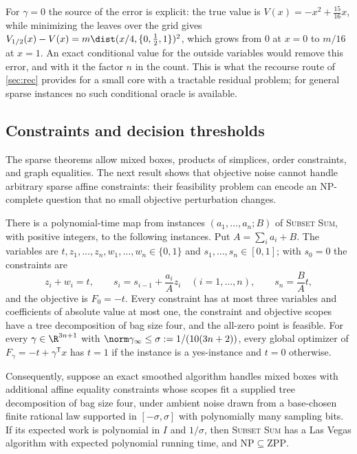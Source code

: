 For $\gamma=0$ the source of the error is explicit: the true value is
$V(x)=-x^2+\frac{15}{16}x$, while minimizing the leaves over the grid gives
$V_{1/2}(x)-V(x)=m\dist(x/4,\{0,\frac12,1\})^2$, which grows from $0$ at
$x=0$ to $m/16$ at $x=1$. An exact conditional value for the outside
variables would remove this error, and with it the factor $n$ in the count.
This is what the recourse route of \cref{sec:rec} provides for a small core
with a tractable residual problem; for general sparse instances no such
conditional oracle is available.

\subsection{Constraints and decision thresholds}\label{sec:lim:constraints}

The sparse theorems allow mixed boxes, products of simplices, order
constraints, and graph equalities. The next result shows that objective
noise cannot handle arbitrary sparse affine constraints: their feasibility
problem can encode an NP-complete question that no small objective
perturbation changes.

\begin{theorem}\label{thm:lim:constraints}
There is a polynomial-time map from instances $(a_1,\ldots,a_n;B)$ of
\textsc{Subset Sum}, with positive integers, to the following instances.
Put $A=\sum_ia_i+B$. The variables are $t,z_1,\ldots,z_n,w_1,\ldots,w_n\in
\{0,1\}$ and $s_1,\ldots,s_n\in[0,1]$; with $s_0=0$ the constraints are
\[
 z_i+w_i=t,\qquad s_i=s_{i-1}+\frac{a_i}Az_i\quad(i=1,\ldots,n),\qquad
 s_n=\frac BAt,
\]
and the objective is $F_0=-t$. Every constraint has at most three variables
and coefficients of absolute value at most one, the constraint and objective
scopes have a tree decomposition of bag size four, and the all-zero point is
feasible. For every $\gamma\in\R^{3n+1}$ with
$\norm\gamma_\infty\le\sigma:=1/(10(3n+2))$, every global optimizer of
$F_\gamma=-t+\gamma^{\mathsf T}x$ has $t=1$ if the instance is a
yes-instance and $t=0$ otherwise.

Consequently, suppose an exact smoothed algorithm handles mixed boxes with
additional affine equality constraints whose scopes fit a supplied tree
decomposition of bag size four, under ambient noise drawn from a
base-chosen finite rational law supported in $[-\sigma,\sigma]$ with
polynomially many sampling bits. If its expected work is polynomial in $I$
and $1/\sigma$, then \textsc{Subset Sum} has a Las Vegas algorithm with
expected polynomial running time, and $\mathrm{NP}\subseteq\mathrm{ZPP}$.
\end{theorem}

